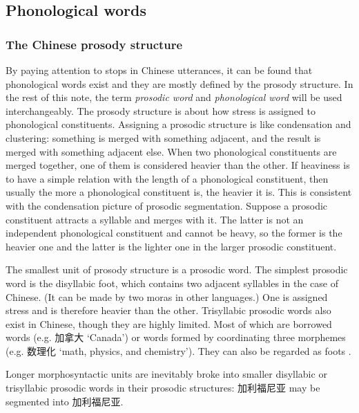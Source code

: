 \documentclass[UTF8, a4paper, oneside, scheme=plain]{ctexrep}
\newcommand*{\citesec}[1]{\S~{#1}}
\newcommand*{\term}[1]{\emph{#1}}
\newcommand{\translate}[1]{`#1'}
\begin{document}
\subsection{Phonological words}

\subsubsection{The Chinese prosody structure}\label{sec:prosody-structure}

By paying attention to stops in Chinese utterances,
it can be found that phonological words exist and they are mostly defined by the prosody structure.
In the rest of this note,
the term \term{prosodic word} and \term{phonological word}
will be used interchangeably.
The prosody structure is about how stress is assigned to phonological constituents.
Assigning a prosodic structure is like condensation and clustering:
something is merged with something adjacent,
and the result is merged with something adjacent else.
When two phonological constituents are merged together,
one of them is considered heavier than the other.
If heaviness is to have a simple relation with the length of a phonological constituent,
then usually the more a phonological constituent is,
the heavier it is.
This is consistent with the condensation picture of prosodic segmentation.
Suppose a prosodic constituent attracts a syllable and merges with it.
The latter is not an independent phonological constituent
and cannot be heavy,
so the former is the heavier one and the latter is the lighter one in the larger prosodic constituent.

The smallest unit of prosody structure 
is a prosodic word.
The simplest prosodic word is the disyllabic foot, 
which contains two adjacent syllables in the case of Chinese.
(It can be made by two moras in other languages.)
One is assigned stress and is therefore heavier than the other.
Trisyllabic prosodic words also exist in Chinese,
though they are highly limited.
Most of which are borrowed words (e.g. 加拿大 \translate{Canada})
or words formed by coordinating three morphemes (e.g. 数理化 \translate{math, physics, and chemistry}).
They can also be regarded as foots \citet[\citesec{2.2}]{feng2000}.

Longer morphosyntactic units are inevitably broke into smaller disyllabic or trisyllabic prosodic words
in their prosodic structures:
加利福尼亚 may be segmented into 加利\textbar 福尼亚.
\end{document}
